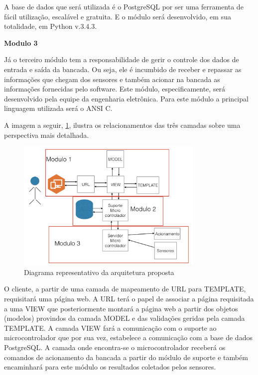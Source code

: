 	A base de dados que será utilizada é o PostgreSQL por ser uma ferramenta de fácil utilização, escalável e gratuita. E o módulo será desenvolvido, em sua totalidade, em Python v.3.4.3.


	\textbf{Modulo 3}

	Já o terceiro módulo tem a responsabilidade de gerir o controle dos dados de entrada e saída da bancada. Ou seja, ele é incumbido de receber e repassar as informações que chegam dos sensores e também acionar na bancada as informações fornecidas pelo software. Este módulo, especificamente, será desenvolvido pela equipe da engenharia eletrônica. Para este módulo a principal linguagem utilizada será o ANSI C.


	A imagem a seguir, \ref{img:modulos}, ilustra os relacionamentos das três camadas sobre uma perspectiva mais detalhada.

	\begin{figure}[h]
		\centering
		\includegraphics[width=0.8\textwidth]{resource/modulos.png}
		\caption{Diagrama representativo da arquitetura proposta}
		\label{img:modulos}
	\end{figure}

	O cliente, a partir de uma camada de mapeamento de URL para TEMPLATE, requisitará uma página web. A URL terá o papel de associar a página requisitada a uma VIEW que posteriormente montará a página web a partir dos objetos (modelos) provindos da camada MODEL e das validações geridas pela camada TEMPLATE. A camada VIEW fará a comunicação com o suporte ao microcontrolador que por sua vez, estabelece a comunicação com a base de dados PostgreSQL. A camada onde encontra-se o microcontrolador receberá os comandos de acionamento da bancada a partir do módulo de suporte e também encaminhará para este módulo os resultados coletados pelos sensores.

